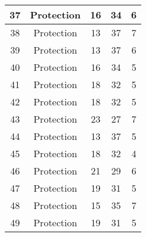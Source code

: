 \documentclass[results.tex]{subfiles}
\begin{document}
\begin{center}
\begin{tabular}{| c || c | c | c | c |}
            \hline
            37                      & Protection                   & 16                     & 34                      & 6                    \\
            \hline
            38                      & Protection                   & 13                     & 37                      & 7                    \\
            \hline
            39                      & Protection                   & 13                     & 37                      & 6                    \\
            \hline
            40                      & Protection                   & 16                     & 34                      & 5                    \\
            \hline
            41                      & Protection                   & 18                     & 32                      & 5                    \\
            \hline
            42                      & Protection                   & 18                     & 32                      & 5                    \\
            \hline
            43                      & Protection                   & 23                     & 27                      & 7                    \\
            \hline
            44                      & Protection                   & 13                     & 37                      & 5                    \\
            \hline
            45                      & Protection                   & 18                     & 32                      & 4                    \\
            \hline
            46                      & Protection                   & 21                     & 29                      & 6                    \\
            \hline
            47                      & Protection                   & 19                     & 31                      & 5                    \\
            \hline
            48                      & Protection                   & 15                     & 35                      & 7                    \\
            \hline
            49                      & Protection                   & 19                     & 31                      & 5                    \\
            \hline
        \end{tabular}
    \end{center}
\end{document}
